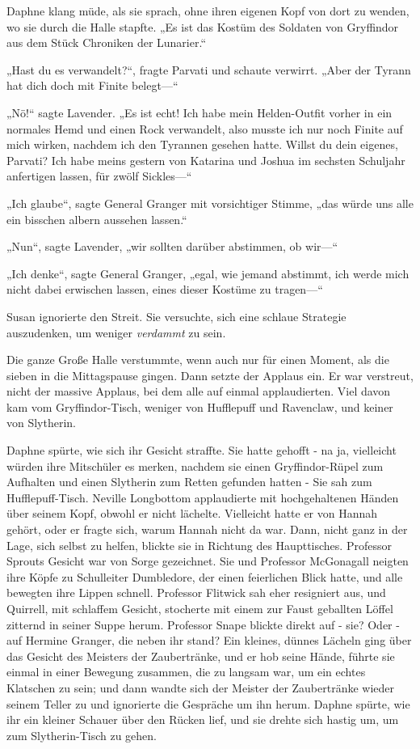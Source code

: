 {Daphne klang müde, als sie sprach, ohne ihren eigenen Kopf von dort zu wenden, wo sie durch die Halle stapfte. „Es ist das Kostüm des Soldaten von Gryffindor aus dem Stück Chroniken der Lunarier.“

„Hast du es verwandelt?“, fragte Parvati und schaute verwirrt. „Aber der Tyrann hat dich doch mit Finite belegt—“

„Nö!“ sagte Lavender. „Es ist echt! Ich habe mein Helden-Outfit vorher in ein normales Hemd und einen Rock verwandelt, also musste ich nur noch Finite auf mich wirken, nachdem ich den Tyrannen gesehen hatte. Willst du dein eigenes, Parvati? Ich habe meins gestern von Katarina und Joshua im sechsten Schuljahr anfertigen lassen, für zwölf Sickles—“

„Ich glaube“, sagte General Granger mit vorsichtiger Stimme, „das würde uns alle ein bisschen albern aussehen lassen.“

„Nun“, sagte Lavender, „wir sollten darüber abstimmen, ob wir—“

„Ich denke“, sagte General Granger, „egal, wie jemand abstimmt, ich werde mich nicht dabei erwischen lassen, eines dieser Kostüme zu tragen—“

Susan ignorierte den Streit. Sie versuchte, sich eine schlaue Strategie auszudenken, um weniger \emph{verdammt} zu sein.

Die ganze Große Halle verstummte, wenn auch nur für einen Moment, als die sieben in die Mittagspause gingen. Dann setzte der Applaus ein. Er war verstreut, nicht der massive Applaus, bei dem alle auf einmal applaudierten. Viel davon kam vom Gryffindor-Tisch, weniger von Hufflepuff und Ravenclaw, und keiner von Slytherin.

Daphne spürte, wie sich ihr Gesicht straffte. Sie hatte gehofft - na ja, vielleicht würden ihre Mitschüler es merken, nachdem sie einen Gryffindor-Rüpel zum Aufhalten und einen Slytherin zum Retten gefunden hatten - Sie sah zum Hufflepuff-Tisch. Neville Longbottom applaudierte mit hochgehaltenen Händen über seinem Kopf, obwohl er nicht lächelte. Vielleicht hatte er von Hannah gehört, oder er fragte sich, warum Hannah nicht da war. Dann, nicht ganz in der Lage, sich selbst zu helfen, blickte sie in Richtung des Haupttisches. Professor Sprouts Gesicht war von Sorge gezeichnet. Sie und Professor McGonagall neigten ihre Köpfe zu Schulleiter Dumbledore, der einen feierlichen Blick hatte, und alle bewegten ihre Lippen schnell. Professor Flitwick sah eher resigniert aus, und Quirrell, mit schlaffem Gesicht, stocherte mit einem zur Faust geballten Löffel zitternd in seiner Suppe herum. Professor Snape blickte direkt auf - sie? Oder - auf Hermine Granger, die neben ihr stand? Ein kleines, dünnes Lächeln ging über das Gesicht des Meisters der Zaubertränke, und er hob seine Hände, führte sie einmal in einer Bewegung zusammen, die zu langsam war, um ein echtes Klatschen zu sein; und dann wandte sich der Meister der Zaubertränke wieder seinem Teller zu und ignorierte die Gespräche um ihn herum. Daphne spürte, wie ihr ein kleiner Schauer über den Rücken lief, und sie drehte sich hastig um, um zum Slytherin-Tisch zu gehen.

}
